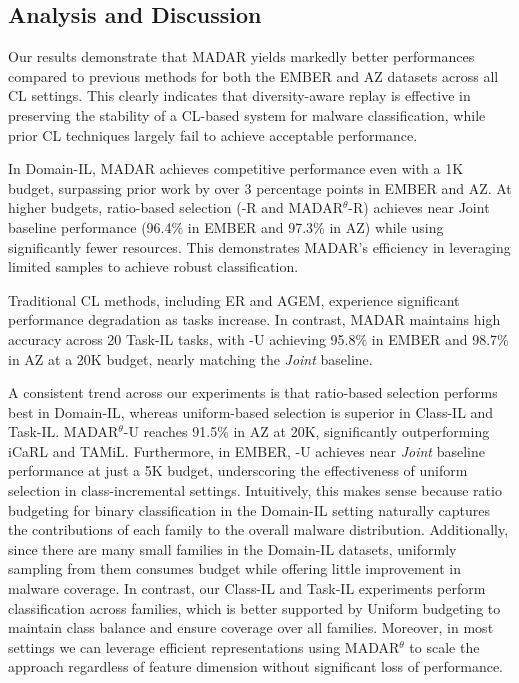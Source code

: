 \subsection{Analysis and Discussion}\label{diss}


Our results demonstrate that MADAR yields markedly better performances compared to previous methods for both the EMBER and AZ datasets across all CL settings. This clearly indicates that diversity-aware replay is effective in preserving the stability of a CL-based system for malware classification, while prior CL techniques largely fail to achieve acceptable performance.


 In Domain-IL, MADAR achieves competitive performance even with a 1K budget, surpassing prior work by over 3 percentage points in EMBER and AZ. At higher budgets, ratio-based selection (\system-R and MADAR$^{\theta}$-R) achieves near Joint baseline performance (96.4\% in EMBER and 97.3\% in AZ) while using significantly fewer resources. This demonstrates MADAR’s efficiency in leveraging limited samples to achieve robust classification.


 Traditional CL methods, including ER and AGEM, experience significant performance degradation as tasks increase. In contrast, MADAR maintains high accuracy across 20 Task-IL tasks, with \system-U achieving 95.8\% in EMBER and 98.7\% in AZ at a 20K budget, nearly matching the {\em Joint} baseline.




 A consistent trend across our experiments is that ratio-based selection performs best in Domain-IL, whereas uniform-based selection is superior in Class-IL and Task-IL. MADAR$^{\theta}$-U reaches 91.5\% in AZ at 20K, significantly outperforming iCaRL and TAMiL. Furthermore, in EMBER, \system-U achieves near {\em Joint} baseline performance at just a 5K budget, underscoring the effectiveness of uniform selection in class-incremental settings. Intuitively, this makes sense because ratio budgeting for binary classification in the Domain-IL setting naturally captures the contributions of each family to the overall malware distribution. Additionally, since there are many small families in the Domain-IL datasets, uniformly sampling from them consumes budget while offering little improvement in malware coverage. In contrast, our Class-IL and Task-IL experiments perform classification across families, which is better supported by Uniform budgeting to maintain class balance and ensure coverage over all families. Moreover, in most settings we can leverage efficient representations using MADAR$^\theta$ to scale the approach regardless of feature dimension without significant loss of performance.



